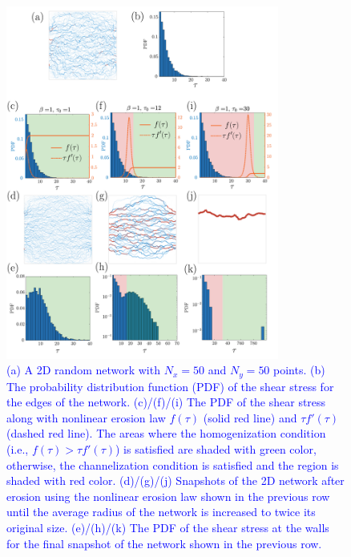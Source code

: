 \documentclass{article}
\newcommand{\Answer}[1]{\noindent {\color{blue}{ #1}}\normalcolor}
\begin{document}
   \begin{figure}[htp]
     \centering \includegraphics[width = 0.8\textwidth]{../sigmoidDelaunay.pdf}
     \caption{\textcolor{blue}{(a) A 2D random network with $N_x=50$ and $N_y=50$ points. (b) The probability distribution function (PDF) of the shear stress for the edges of the network. (c)/(f)/(i) The PDF of the shear stress along with nonlinear erosion law $f(\tau)$ (solid red line) and $\tau f'(\tau)$ (dashed red line). The areas where the homogenization condition (i.e., $f(\tau)>\tau f'(\tau)$) is satisfied are shaded with green color, otherwise, the channelization condition is satisfied and the region is shaded with red color. (d)/(g)/(j) Snapshots of the 2D network after erosion using the nonlinear erosion law shown in the previous row until the average radius of the network is increased to twice its original size. (e)/(h)/(k) The PDF of the shear stress at the walls for the final snapshot of the network shown in the previous row. 
    }}
     \label{SIfig:fig9-sigmoidDelaunay}
 \end{figure}
 \\
 
 \clearpage 



 \Answer{
     $\bullet$ (iii) From supplementary material, section S3:}
     
\end{document}
